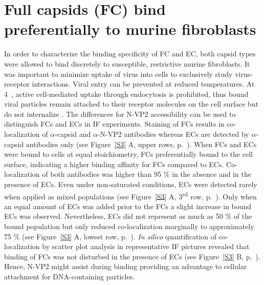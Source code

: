 \section{Full capsids (FC) bind preferentially to murine fibroblasts}

In order to characterize the binding specificity of FC and EC, both capsid types were allowed to bind discretely to susceptible, restrictive murine fibroblasts. It was important to minimize uptake of virus into cells to exclusively study virus-receptor interactions. Viral entry can be prevented at reduced temperatures. At 4~\textcelsius, active cell-mediated uptake through endocytosis is prohibited, thus bound viral particles remain attached to their receptor molecules on the cell surface but do not internalize \cite{pmid20517}. The differences for N-VP2 accessibility can be used to distinguish FCs and ECs in IF experiments. Staining of FCs results in co-localization of $\alpha$-capsid and $\alpha$-N-VP2 antibodies whereas ECs are detected by $\alpha$-capsid antibodies only (see Figure~\ref{S3} A, upper rows, p.~\pageref{S3}). When FCs and ECs were bound to cells at equal stoichiometry, FCs preferentially bound to the cell surface, indicating a higher binding affinity for FCs compared to ECs. Co-localization of both antibodies was higher than 95 \% in the absence and in the presence of ECs. Even under non-saturated conditions, ECs were detected rarely when applied as mixed populations (see Figure~\ref{S3} A, 3\textsuperscript{rd} row, p.~\pageref{S3}). Only when an equal amount of ECs was added prior to the FCs a slight increase in bound ECs was observed. Nevertheless, ECs did not represent as much as 50 \% of the bound population but only reduced co-localization marginally to approximately 75 \% (see Figure~\ref{S3} A, lowest row, p.~\pageref{S3}). \textit{In silico} quantification of co-localization by scatter plot analysis in representative IF pictures revealed that binding of FCs was not disturbed in the presence of ECs (see Figure~\ref{S3} B, p.~\pageref{S3}). Hence, N-VP2 might assist during binding providing an advantage to cellular attachment for DNA-containing particles.            


